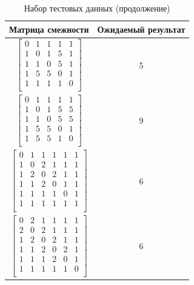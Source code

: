 \documentclass[a4paper,14pt]{report}
\begin{document}
\begin{table}[h]
	\caption{Набор тестовых данных (продолжение)}
		\begin{tabular}{|c | c |}
	 	\hline
		Матрица смежности & Ожидаемый результат \\ [0.5ex]
	 	\hline\hline

		$\begin{bmatrix}
		0 & 1 & 1 & 1 & 1 \\
		1 & 0 & 1 & 5 & 1 \\
		1 & 1 & 0 & 5 & 1 \\
		1 & 5 & 5 & 0 & 1 \\
		1 & 1 & 1 & 1 & 0 \\
		\end{bmatrix}$ & 5 \\
		\hline

		$\begin{bmatrix}
		0 & 1 & 1 & 1 & 1 \\
		1 & 0 & 1 & 5 & 5 \\
		1 & 1 & 0 & 5 & 5 \\
		1 & 5 & 5 & 0 & 1 \\
		1 & 5 & 5 & 1 & 0 \\
		\end{bmatrix}$ & 9 \\
		\hline

		$\begin{bmatrix}
		0 & 1 & 1 & 1 & 1 & 1 \\
		1 & 0 & 2 & 1 & 1 & 1 \\
		1 & 2 & 0 & 2 & 1 & 1 \\
		1 & 1 & 2 & 0 & 1 & 1 \\
		1 & 1 & 1 & 1 & 0 & 1 \\
		1 & 1 & 1 & 1 & 1 & 1 \\
		\end{bmatrix}$ & 6 \\
		\hline

		$\begin{bmatrix}
		0 & 2 & 1 & 1 & 1 & 1 \\
		2 & 0 & 2 & 1 & 1 & 1 \\
		1 & 2 & 0 & 2 & 1 & 1 \\
		1 & 1 & 2 & 0 & 2 & 1 \\
		1 & 1 & 1 & 2 & 0 & 1 \\
		1 & 1 & 1 & 1 & 1 & 0 \\
		\end{bmatrix}$ & 6 \\
		\hline

		\end{tabular}
\end{table}
\end{document}
